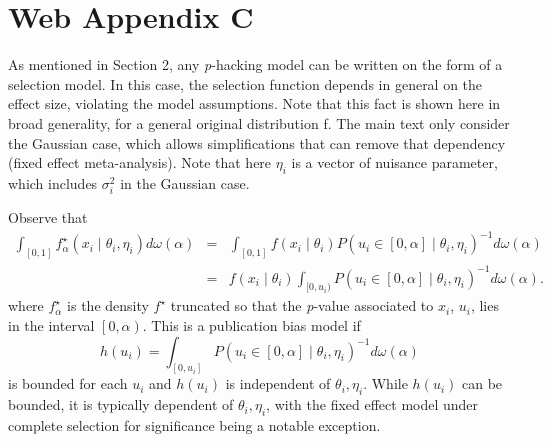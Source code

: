 \section*{Web Appendix C}

As mentioned in Section 2, any \textit{p}-hacking model can be written on the form of a selection model. In this case, the selection function depends in general on the effect size, violating the model assumptions. Note that this fact is shown here in broad generality, for a general original distribution f. The main text only consider the Gaussian case, which allows simplifications that can remove that dependency (fixed effect meta-analysis). Note that here $\eta_i$ is a vector of nuisance parameter, which includes $\sigma_i^2$ in the Gaussian case.

Observe that
\begin{eqnarray*}
\int_{[0,1]}f_\alpha^{\star}(x_{i}\mid\theta_{i},\eta_{i})d\omega(\alpha) & = & \int_{[0,1]}f(x_{i}\mid\theta_{i})P(u_i\in\left[0,\alpha\right]\mid\theta_{i},\eta_{i})^{-1}d\omega(\alpha)\\
 & = & f(x_{i}\mid\theta_{i})\int_{[0,u_i)}P(u_i\in\left[0,\alpha\right]\mid\theta_{i},\eta_{i})^{-1}d\omega(\alpha).
\end{eqnarray*}
where $f_\alpha^{\star}$ is the density $f^{\star}$ truncated so that the \textit{p}-value associated to $x_i$, $u_i$, lies in the interval $\left[0,\alpha\right)$. This is a publication bias model if $$h(u_i)=\int_{[0,u_i]}P(u_i\in\left[0,\alpha\right]\mid\theta_{i},\eta_{i})^{-1}d\omega(\alpha)$$ is bounded for each $u_i$ and $h(u_i)$ is independent of $\theta_{i},\eta_{i}$. While $h(u_i)$ can be bounded, it is typically dependent of $\theta_{i},\eta_{i}$, with the fixed effect model under complete selection for significance being a notable exception.

